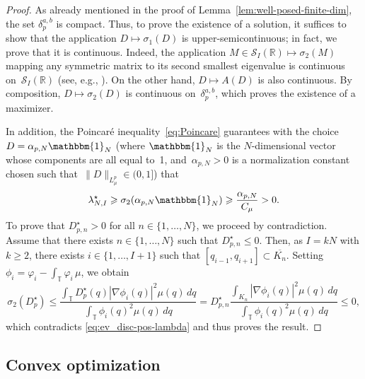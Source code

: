\documentclass{article}
\newcommand{\dps}{\displaystyle }
\newcommand{\R}{\mathbb{R}}
\renewcommand{\leq}{\leqslant}
\renewcommand{\geq}{\geqslant}
\def\R{\mathbb{R}}
\def\T{\mathbb{T}}
\newcommand{\diff}{D}
\newcommand{\diffset}{\delta}
\begin{document}
\begin{proof}
  As already mentioned in the proof of Lemma~\ref{lem:well-posed-finite-dim}, the set $\diffset_p^{a,b}$ is compact. Thus, to prove the existence of a solution, it suffices to show that the application $\diff\mapsto \sigma_1(\diff)$ is upper-semicontinuous; in fact, we prove that it is continuous. Indeed, the application $M\in\mathcal{S}_{I}(\R)\mapsto \sigma_2(M)$ mapping any symmetric matrix to its second smallest eigenvalue is continuous on~$\mathcal{S}_{I}(\R)$ (see, e.g., \cite[Corollary~III.2.6]{Bhatia:2023544}). On the other hand, $\diff \mapsto A(\diff)$ is also continuous. By composition, $\diff \mapsto \sigma_2(\diff)$ is continuous on~$\delta_p^{a,b}$, which proves the existence of a maximizer.

  In addition, the Poincar\'e inequality~\eqref{eq:Poincare} guarantees with the choice $\diff = \alpha_{p,N} \mathbbm{1}_N$ (where $\mathbbm{1}_N$ is the $N$-dimensional vector whose components are all equal to~1, and~$\alpha_{p,N}>0$ is a normalization constant chosen such that~$\|\diff\|_{L^p_\mu} \in (0,1]$) that 
  \begin{equation}
    \label{eq:ev_disc-pos-lambda}
    \lambda_{N,I}^{\star} \geq \sigma_2(\alpha_{p,N} \mathbbm{1}_N) \geq \frac{\alpha_{p,N}}{C_\mu} > 0.
  \end{equation}
  To prove that $\diff^{\star}_{p,n}>0$ for all $n\in\{1,\ldots,N\}$, we proceed by contradiction. Assume that there exists $n\in\{1,\ldots,N\}$ such that $\diff^{\star}_{p,n} \leq 0$. Then, as $I = kN$ with $k\geq 2$, there exists $i\in\{1,\ldots, I+1\}$ such that $[q_{i-1}, q_{i+1}]\subset \overline{K_n}$. Setting $\phi_i = \varphi_i - \int_{\T}\varphi_i \, \mu$, we obtain
  \begin{equation}
    \sigma_2(\diff^{\star}_p)\leq \frac{\dps \int_{\T} \diff^{\star}_p(q)|\nabla \phi_i(q)|^2\mu(q)\,dq}{\dps \int_{\T}\phi_i(q)^2\mu(q)\,dq} = \diff^{\star}_{p,n}\frac{\dps \int_{K_n} |\nabla \phi_i(q)|^2\mu(q)\,dq}{\dps \int_{\T}\phi_i(q)^2\mu(q)\,dq}\leq 0,
  \end{equation}
  which contradicts \eqref{eq:ev_disc-pos-lambda} and thus proves the result.
\end{proof}

\subsection{Convex optimization}
\label{subssec:optim-numeric}
\end{document}
